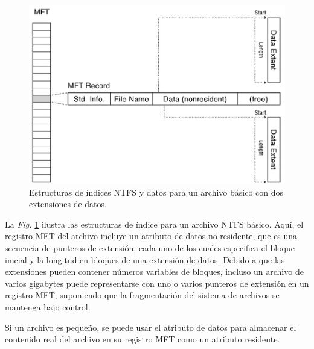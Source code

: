 \documentclass[10pt]{book}
\begin{document}
\begin{figure}[tbhp]
\centerline{\includegraphics[scale=0.65]{img/fig1308}}
\caption{Estructuras de índices NTFS y datos para un archivo básico con dos extensiones de datos.}
\label{fig1308}
\end{figure}

La \textit{Fig.} \ref{fig1308} ilustra las estructuras de índice para un archivo NTFS básico. Aquí, el registro MFT del archivo incluye un atributo de datos no residente, que es una secuencia de punteros de extensión, cada uno de los cuales especifica el bloque inicial y la longitud en bloques de una extensión de datos. Debido a que las extensiones pueden contener números variables de bloques, incluso un archivo de varios gigabytes puede representarse con uno o varios punteros de extensión en un registro MFT, suponiendo que la fragmentación del sistema de archivos se mantenga bajo control.

Si un archivo es pequeño, se puede usar el atributo de datos para almacenar el contenido real del archivo en su registro MFT como un atributo residente.
\end{document}
